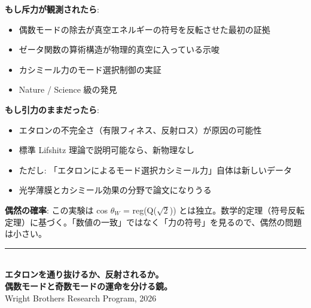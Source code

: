 \documentclass[12pt,a4paper]{article}
\begin{document}
\begin{honestbox}[この実験でわかること]

\textbf{もし斥力が観測されたら}:
\begin{itemize}
\item 偶数モードの除去が真空エネルギーの符号を反転させた最初の証拠
\item ゼータ関数の算術構造が物理的真空に入っている示唆
\item カシミール力のモード選択制御の実証
\item Nature / Science 級の発見
\end{itemize}

\textbf{もし引力のままだったら}:
\begin{itemize}
\item エタロンの不完全さ（有限フィネス、反射ロス）が原因の可能性
\item 標準 Lifshitz 理論で説明可能なら、新物理なし
\item ただし: 「エタロンによるモード選択カシミール力」自体は新しいデータ
\item 光学薄膜とカシミール効果の分野で論文になりうる
\end{itemize}

\textbf{偶然の確率}: この実験は cos $\theta_W$ = reg(Q($\sqrt{2}$)) とは独立。数学的定理（符号反転定理）に基づく。「数値の一致」ではなく「力の符号」を見るので、偶然の問題は小さい。
\end{honestbox}

\vfill

\begin{center}
\rule{10cm}{0.4pt}\\[0.5cm]
{\Large\bfseries エタロンを通り抜けるか、反射されるか。}\\[0.2cm]
{\Large\bfseries 偶数モードと奇数モードの運命を分ける鏡。}\\[0.3cm]
{\small Wright Brothers Research Program, 2026}
\end{center}
\end{document}
